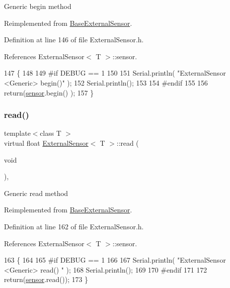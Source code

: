 Generic begin method 

Reimplemented from \hyperlink{classBaseExternalSensor_a87d132803d4f4fdd4e66332809f0c9a0}{Base\+External\+Sensor}.



Definition at line 146 of file External\+Sensor.\+h.



References External\+Sensor$<$ T $>$\+::sensor.


\begin{DoxyCode}
147     \{
148     
149 \textcolor{preprocessor}{    #if DEBUG == 1 }
150 
151         Serial.println( \textcolor{stringliteral}{"ExternalSensor <Generic> begin()"} );
152         Serial.println();
153     
154 \textcolor{preprocessor}{    #endif}
155 
156         \textcolor{keywordflow}{return}(\hyperlink{classExternalSensor_a6e1f518119abe08c14b498ce24a7e1b3}{sensor}.begin() );  
157     \}
\end{DoxyCode}
\mbox{\label{classExternalSensor_a5fb3afc7d244fb86dac68ab5481bc407}} 
\subsubsection{\texorpdfstring{read()}{read()}}
{\footnotesize\ttfamily template$<$class T $>$ \\
virtual float \hyperlink{classExternalSensor}{External\+Sensor}$<$ T $>$\+::read (\begin{DoxyParamCaption}\item[{void}]{ }\end{DoxyParamCaption})\hspace{0.3cm}{\ttfamily [inline]}, {\ttfamily [virtual]}}

Generic read method 

Reimplemented from \hyperlink{classBaseExternalSensor_a1564f16deacf57b51b9948ac29db4291}{Base\+External\+Sensor}.



Definition at line 162 of file External\+Sensor.\+h.



References External\+Sensor$<$ T $>$\+::sensor.


\begin{DoxyCode}
163     \{
164     
165 \textcolor{preprocessor}{    #if DEBUG == 1 }
166 
167         Serial.println( \textcolor{stringliteral}{"ExternalSensor <Generic> read() "} );
168         Serial.println();
169         
170 \textcolor{preprocessor}{    #endif}
171 
172         \textcolor{keywordflow}{return}(\hyperlink{classExternalSensor_a6e1f518119abe08c14b498ce24a7e1b3}{sensor}.read());
173     \}
\end{DoxyCode}


